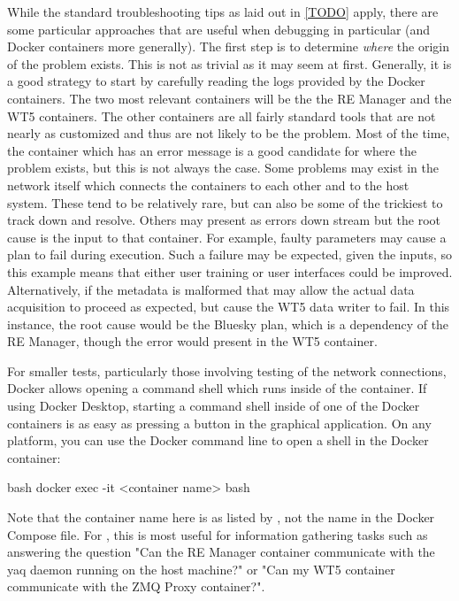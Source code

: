 While the standard troubleshooting tips as laid out in \ref{TODO} apply, there are some particular approaches that are useful when debugging \biab in particular (and Docker containers more generally).
The first step is to determine \textit{where} the origin of the problem exists.
This is not as trivial as it may seem at first.
Generally, it is a good strategy to start by carefully reading the logs provided by the Docker containers.
The two most relevant containers will be the the RE Manager and the WT5 containers.
The other containers are all fairly standard tools that are not nearly as customized and thus are not likely to be the problem.
Most of the time, the container which has an error message is a good candidate for where the problem exists, but this is not always the case.
Some problems may exist in the network itself which connects the containers to each other and to the host system.
These tend to be relatively rare, but can also be some of the trickiest to track down and resolve.
Others may present as errors down stream but the root cause is the input to that container.
For example, faulty parameters may cause a plan to fail during execution.
Such a failure may be expected, given the inputs, so this example means that either user training or user interfaces could be improved.
Alternatively, if the metadata is malformed that may allow the actual data acquisition to proceed as expected, but cause the WT5 data writer to fail.
In this instance, the root cause would be the Bluesky plan, which is a dependency of the RE Manager, though the error would present in the WT5 container.


For smaller tests, particularly those involving testing of the network connections, Docker allows opening a command shell which runs inside of the container.
If using Docker Desktop, starting a command shell inside of one of the Docker containers is as easy as pressing a button in the graphical application.
On any platform, you can use the Docker command line to open a shell in the Docker container:

\begin{codefragment}{bash}
docker exec -it <container name> bash
\end{codefragment}

Note that the container name here is as listed by , not the name in the Docker Compose file.
For \biab, this is most useful for information gathering tasks such as answering the question "Can the RE Manager container communicate with the yaq daemon running on the host machine?" or "Can my WT5 container communicate with the ZMQ Proxy container?".

